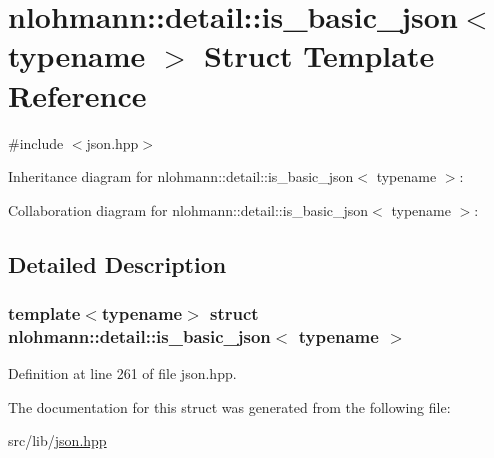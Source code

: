 \hypertarget{structnlohmann_1_1detail_1_1is__basic__json}{}\section{nlohmann\+:\+:detail\+:\+:is\+\_\+basic\+\_\+json$<$ typename $>$ Struct Template Reference}
\label{structnlohmann_1_1detail_1_1is__basic__json}


{\ttfamily \#include $<$json.\+hpp$>$}



Inheritance diagram for nlohmann\+:\+:detail\+:\+:is\+\_\+basic\+\_\+json$<$ typename $>$\+:


Collaboration diagram for nlohmann\+:\+:detail\+:\+:is\+\_\+basic\+\_\+json$<$ typename $>$\+:


\subsection{Detailed Description}
\subsubsection*{template$<$typename$>$\newline
struct nlohmann\+::detail\+::is\+\_\+basic\+\_\+json$<$ typename $>$}



Definition at line 261 of file json.\+hpp.



The documentation for this struct was generated from the following file\+:\begin{DoxyCompactItemize}
\item 
src/lib/\hyperlink{json_8hpp}{json.\+hpp}\end{DoxyCompactItemize}
